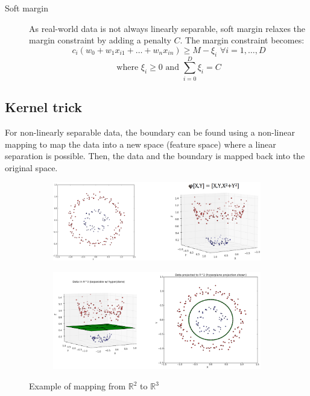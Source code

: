 \begin{description}
        \begin{description}
            \item[Soft margin] 
                As real-world data is not always linearly separable, 
                soft margin relaxes the margin constraint by adding a penalty $C$.
                The margin constraint becomes:
                \[ c_i(w_0 + w_1 x_{i1} + \dots + w_n x_{in}) \geq M - \xi_i \,\, \forall i = 1, \dots, D \]
                \[ \text{where } \xi_i \geq 0 \text{ and } \sum_{i=0}^{D} \xi_i = C \]
        \end{description}
\end{description}


\subsection{Kernel trick}
For non-linearly separable data, the boundary can be found using a non-linear mapping 
to map the data into a new space (feature space) where a linear separation is possible.
Then, the data and the boundary is mapped back into the original space.

\begin{figure}[H]
    \begin{subfigure}{0.49\textwidth}
        \centering
        \includegraphics[width=\linewidth]{img/svm_kernel_example1.png}
    \end{subfigure}
    \begin{subfigure}{0.49\textwidth}
        \centering
        \includegraphics[width=\linewidth]{img/svm_kernel_example2.png}
    \end{subfigure}
    \caption{Example of mapping from $\mathbb{R}^2$ to $\mathbb{R}^3$}
\end{figure}

